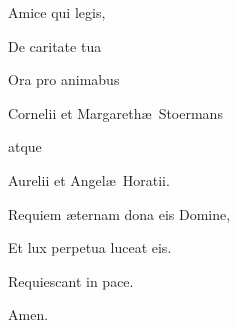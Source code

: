 \documentclass[12pt]{article} %
\begin{document}
\gresetfirstlineaboveinitial{\small \textsc{ \textbf{\textcolor{benred8}{VI}}}}{\small \textsc{ \textbf{\textcolor{benred8}{VI}}}}

\vspace{2mm}

\gresetfirstlineaboveinitial{\small \textsc{ \textbf{\textcolor{benred8}{VI}}}}{\small \textsc{ \textbf{\textcolor{benred8}{VI}}}}

\vspace{2mm}

\gresetfirstlineaboveinitial{\small \textsc{ \textbf{\textcolor{benred8}{V}}}}{\small \textsc{ \textbf{\textcolor{benred8}{V}}}}

\vspace{2mm}

\newpage


\thispagestyle{empty}


\vspace*{\fill}

\begin{center}

\vspace{2 mm}

Amice qui legis,

De caritate tua

Ora pro animabus

\begin{Large}
Cornelii et Margareth\ae\ Stoermans
\end{Large}

atque

\begin{Large}
Aurelii et Angel\ae\ Horatii.
\end{Large}

Requiem \ae ternam dona eis Domine,

Et lux perpetua luceat eis.

Requiescant in pace.

Amen.

\end{center}

\vspace*{\fill}
\end{document}
